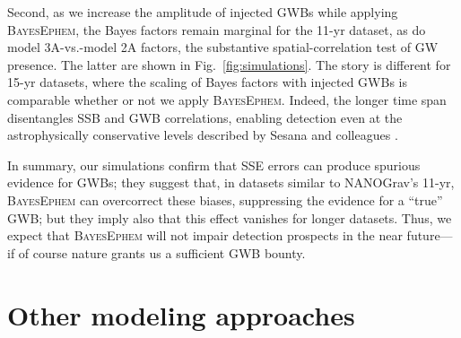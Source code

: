 \documentclass{aastex63}
\begin{document}
Second, as we increase the amplitude of injected GWBs while applying \textsc{BayesEphem}, the Bayes factors remain marginal for the 11-yr dataset, as do model 3A-vs.-model 2A factors, the substantive spatial-correlation test of GW presence. The latter are shown in Fig.\ \ref{fig:simulations}.
The story is different for 15-yr datasets, where the scaling of Bayes factors with injected GWBs is comparable whether or not we apply \textsc{BayesEphem}. Indeed, the longer time span disentangles SSB and GWB correlations, enabling detection even at the astrophysically conservative levels described by Sesana and colleagues \citep{2016MNRAS.463L...6S}.

In summary, our simulations confirm that SSE errors can produce spurious evidence for GWBs; they suggest that, in datasets similar to NANOGrav's 11-yr, \textsc{BayesEphem} can overcorrect these biases, suppressing the evidence for a ``true'' GWB; but they imply also that this effect vanishes for longer datasets. Thus, we expect that \textsc{BayesEphem} will not impair detection prospects in the near future---if of course nature grants us a sufficient GWB bounty.

\section{Other modeling approaches}
\label{sec:othermodels}
\end{document}
